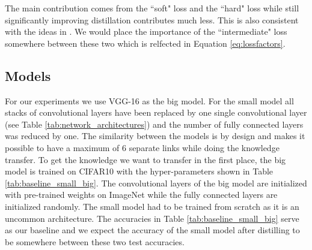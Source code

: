 \documentclass[10pt,twocolumn,letterpaper]{article}
\begin{document}
The main contribution comes from the ``soft" loss and the ``hard" loss while still significantly improving distillation contributes much less. This is also consistent with the ideas in \cite{hinton2015distilling}. We would place the importance of the ``intermediate" loss somewhere between these two which is relfected in Equation \ref{eq:lossfactors}.

\subsection{Models}

For our experiments we use VGG-16 \cite{DBLP:journals/corr/SimonyanZ14a} as the big model. For the small model all stacks of convolutional layers have been replaced by one single convolutional layer (see Table \ref{tab:network_architectures}) and the number of fully connected layers was reduced by one. The similarity between the models is by design and makes it possible to have a maximum of 6 separate links while doing the knowledge transfer. To get the knowledge we want to transfer in the first place, the big model is trained on CIFAR10 \cite{krizhevsky2009learning} with the hyper-parameters shown in Table \ref{tab:baseline_small_big}. The convolutional layers of the big model are initialized with pre-trained weights on ImageNet \cite{ILSVRC15} while the fully connected layers are initialized randomly. The small model had to be trained from scratch as it is an uncommon architecture. The accuracies in Table \ref{tab:baseline_small_big} serve as our baseline and we expect the accuracy of the small model after distilling to be somewhere between these two test accuracies.
\end{document}
